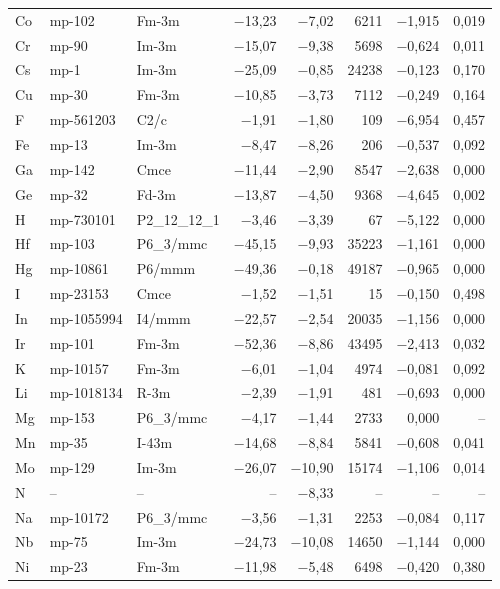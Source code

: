 \begin{longtable}{@{}ll l@{\hspace{4pt}} rrrrr@{}}
Co & mp-102 & Fm-3m & $-$13{,}23 & $-$7{,}02 & 6211 & $-$1{,}915 & 0{,}019 \\
Cr & mp-90 & Im-3m & $-$15{,}07 & $-$9{,}38 & 5698 & $-$0{,}624 & 0{,}011 \\
Cs & mp-1 & Im-3m & $-$25{,}09 & $-$0{,}85 & 24238 & $-$0{,}123 & 0{,}170 \\
Cu & mp-30 & Fm-3m & $-$10{,}85 & $-$3{,}73 & 7112 & $-$0{,}249 & 0{,}164 \\
F & mp-561203 & C2/c & $-$1{,}91 & $-$1{,}80 & 109 & $-$6{,}954 & 0{,}457 \\
Fe & mp-13 & Im-3m & $-$8{,}47 & $-$8{,}26 & 206 & $-$0{,}537 & 0{,}092 \\
Ga & mp-142 & Cmce & $-$11{,}44 & $-$2{,}90 & 8547 & $-$2{,}638 & 0{,}000 \\
Ge & mp-32 & Fd-3m & $-$13{,}87 & $-$4{,}50 & 9368 & $-$4{,}645 & 0{,}002 \\
H & mp-730101 & P2_12_12_1 & $-$3{,}46 & $-$3{,}39 & 67 & $-$5{,}122 & 0{,}000 \\
Hf & mp-103 & P6_3/mmc & $-$45{,}15 & $-$9{,}93 & 35223 & $-$1{,}161 & 0{,}000 \\
Hg & mp-10861 & P6/mmm & $-$49{,}36 & $-$0{,}18 & 49187 & $-$0{,}965 & 0{,}000 \\
I & mp-23153 & Cmce & $-$1{,}52 & $-$1{,}51 & 15 & $-$0{,}150 & 0{,}498 \\
In & mp-1055994 & I4/mmm & $-$22{,}57 & $-$2{,}54 & 20035 & $-$1{,}156 & 0{,}000 \\
Ir & mp-101 & Fm-3m & $-$52{,}36 & $-$8{,}86 & 43495 & $-$2{,}413 & 0{,}032 \\
K & mp-10157 & Fm-3m & $-$6{,}01 & $-$1{,}04 & 4974 & $-$0{,}081 & 0{,}092 \\
Li & mp-1018134 & R-3m & $-$2{,}39 & $-$1{,}91 & 481 & $-$0{,}693 & 0{,}000 \\
Mg & mp-153 & P6_3/mmc & $-$4{,}17 & $-$1{,}44 & 2733 & 0{,}000 & -- \\
Mn & mp-35 & I-43m & $-$14{,}68 & $-$8{,}84 & 5841 & $-$0{,}608 & 0{,}041 \\
Mo & mp-129 & Im-3m & $-$26{,}07 & $-$10{,}90 & 15174 & $-$1{,}106 & 0{,}014 \\
N & -- & -- & -- & $-$8{,}33 & -- & -- & -- \\
Na & mp-10172 & P6_3/mmc & $-$3{,}56 & $-$1{,}31 & 2253 & $-$0{,}084 & 0{,}117 \\
Nb & mp-75 & Im-3m & $-$24{,}73 & $-$10{,}08 & 14650 & $-$1{,}144 & 0{,}000 \\
Ni & mp-23 & Fm-3m & $-$11{,}98 & $-$5{,}48 & 6498 & $-$0{,}420 & 0{,}380 \\

\end{longtable}

